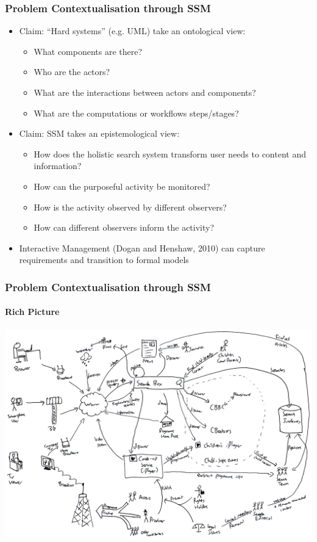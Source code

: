 \documentclass{beamer}
\begin{document}
\begin{frame}
  \frametitle{Problem Contextualisation through SSM}
  \begin{itemize}
    \pause \item Claim: ``Hard systems'' (e.g. UML) take an ontological view:
    \begin{itemize}
      \pause \item What components are there?
      \pause \item Who are the actors?
      \pause \item What are the interactions between actors and components?
      \pause \item What are the computations or workflows steps/stages?
    \end{itemize}
    \pause \item Claim: SSM takes an epistemological view:
    \begin{itemize}
      \pause \item How does the holistic search system transform user needs to content and information?
      \pause \item How can the purposeful activity be monitored?
      \pause \item How is the activity observed by different observers?
      \pause \item How can different observers inform the activity?
    \end{itemize}
    \pause \item Interactive Management (Dogan and Henshaw, 2010) can capture requirements and transition to formal models
  \end{itemize}
\end{frame}

\begin{frame}
  \frametitle{Problem Contextualisation through SSM}
  \framesubtitle{Rich Picture}
  \pause \includegraphics[width=\linewidth]{rich-picture.png}
\end{frame}
\end{document}
